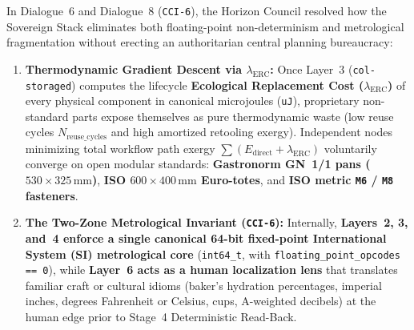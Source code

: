 In Dialogue~6 and Dialogue~8 (\texttt{CCI-6}), the Horizon Council resolved how the Sovereign Stack eliminates both floating-point non-determinism and metrological fragmentation without erecting an authoritarian central planning bureaucracy:
\begin{enumerate}
    \item \textbf{Thermodynamic Gradient Descent via $\lambda_{\mathrm{ERC}}$:} Once Layer~3 (\texttt{col-storaged}) computes the lifecycle \textbf{Ecological Replacement Cost ($\lambda_{\mathrm{ERC}}$)} of every physical component in canonical microjoules (\texttt{uJ}), proprietary non-standard parts expose themselves as pure thermodynamic waste (low reuse cycles $N_{\mathrm{reuse\_cycles}}$ and high amortized retooling exergy). Independent nodes minimizing total workflow path exergy $\sum (E_{\mathrm{direct}} + \lambda_{\mathrm{ERC}})$ voluntarily converge on open modular standards: \textbf{Gastronorm GN~1/1 pans ($530 \times 325\,\mathrm{mm}$)}, \textbf{ISO $600 \times 400\,\mathrm{mm}$ Euro-totes}, and \textbf{ISO metric \texttt{M6} / \texttt{M8} fasteners}.
    \item \textbf{The Two-Zone Metrological Invariant (\texttt{CCI-6}):} Internally, \textbf{Layers~2, 3, and~4 enforce a single canonical 64-bit fixed-point International System (SI) metrological core} (\texttt{int64\_t}, with \texttt{floating\_point\_opcodes == 0}), while \textbf{Layer~6 acts as a human localization lens} that translates familiar craft or cultural idioms (baker's hydration percentages, imperial inches, degrees Fahrenheit or Celsius, cups, A-weighted decibels) at the human edge prior to Stage~4 Deterministic Read-Back.
\end{enumerate}

